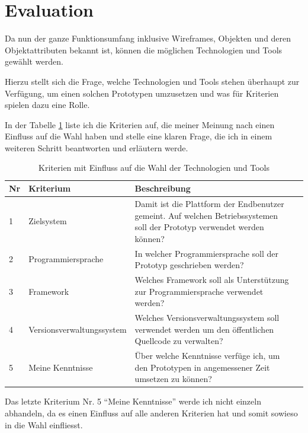 \section{Evaluation}
Da nun der ganze Funktionsumfang inklusive Wireframes, Objekten und deren
Objektattributen bekannt ist, können die möglichen Technologien und Tools
gewählt werden.

Hierzu stellt sich die Frage, welche Technologien und Tools stehen überhaupt
zur Verfügung, um einen solchen Prototypen umzusetzen und was für Kriterien spielen
dazu eine Rolle.

In der Tabelle \ref{tab:umsetzungskriterien} liste ich die Kriterien auf, die
meiner Meinung nach einen Einfluss auf die Wahl haben und stelle eine klaren 
Frage, die ich in einem weiteren Schritt beantworten und erläutern werde.

\begin{table}[h]
\begin{center}
    \begin{tabular}{llp{9cm}l}
        \toprule Nr & Kriterium & Beschreibung \\
        \midrule 1 & Zielsystem & Damit ist die Plattform der Endbenutzer
                 gemeint. Auf welchen Betriebssystemen soll der Prototyp 
                 verwendet werden können? \\
        \midrule 2 & Programmiersprache & In welcher Programmiersprache soll
                 der Prototyp geschrieben werden? \\
        \midrule 3 & Framework & Welches Framework soll als Unterstützung zur
                 Programmiersprache verwendet werden? \\
        \midrule 4 & Versionsverwaltungssystem & Welches Versionsverwaltungssystem soll
                 verwendet werden um den öffentlichen Quellcode zu verwalten? \\
        \midrule 5 & Meine Kenntnisse & Über welche Kenntnisse verfüge ich, um
                 den Prototypen in angemessener Zeit umsetzen zu können? \\
        \bottomrule
    \end{tabular}
    \caption{Kriterien mit Einfluss auf die Wahl der Technologien und Tools}
    \label{tab:umsetzungskriterien}
\end{center}
\end{table}

Das letzte Kriterium Nr. 5 ``Meine Kenntnisse'' werde ich nicht einzeln abhandeln,
da es einen Einfluss auf alle anderen Kriterien hat und somit sowieso in die Wahl
einfliesst.

